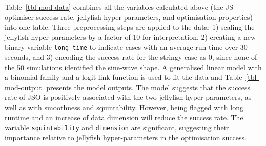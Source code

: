\documentclass[
  number,
  preprint,
  3p]{elsarticle}
\begin{document}
Table~\ref{tbl-mod-data} combines all the variables calculated above
(the JS optimiser success rate, jellyfish hyper-parameters, and
optimisation properties) into one table. Three preprocessing steps are
applied to the data: 1) scaling the jellyfish hyper-parameters by a
factor of 10 for interpretation, 2) creating a new binary variable
\texttt{long\_time} to indicate cases with an average run time over 30
seconds, and 3) encoding the success rate for the stringy case as 0,
since none of the 50 simulations identified the sine-wave shape. A
generalised linear model with a binomial family and a logit link
function is used to fit the data and Table~\ref{tbl-mod-output} presents
the model outputs. The model suggests that the success rate of JSO is
positively associated with the two jellyfish hyper-parameters, as well
as with smoothness and squintability. However, being flagged with long
runtime and an increase of data dimension will reduce the success rate.
The variable \texttt{squintability} and \texttt{dimension} are
significant, suggesting their importance relative to jellyfish
hyper-parameters in the optimisation success.
\end{document}
